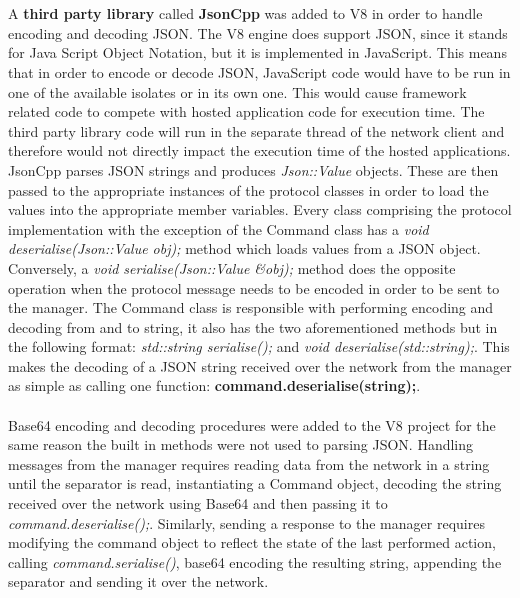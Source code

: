\documentclass{l4proj}
\begin{document}
\\\\
\hspace*{3em} A \textbf{third party library} called \textbf{JsonCpp} was added to V8 in order to handle encoding and decoding JSON. The V8 engine does support JSON, since it stands for Java Script Object Notation, but it is implemented in JavaScript. This means that in order to encode or decode JSON, JavaScript code would have to be run in one of the available isolates or in its own one. This would cause framework related code to compete with hosted application code for execution time. The third party library code will run in the separate thread of the network client and therefore would not directly impact the execution time of the hosted applications. JsonCpp parses JSON strings and produces \textit{Json::Value} objects. These are then passed to the appropriate instances of the protocol classes in order to load the values into the appropriate member variables. Every class comprising the protocol implementation with the exception of the Command class has a \textit{void deserialise(Json::Value obj);} method which loads values from a JSON object. Conversely, a \textit{void serialise(Json::Value \&obj);} method does the opposite operation when the protocol message needs to be encoded in order to be sent to the manager. The Command class is responsible with performing encoding and decoding from and to string, it also has the two aforementioned methods but in the following format: \textit{std::string serialise();} and \textit{void deserialise(std::string);}. This makes the decoding of a JSON string received over the network from the manager as simple as calling one function: \textbf{command.deserialise(string);}.
\\\\
\hspace*{3em} Base64 encoding and decoding procedures were added to the V8 project for the same reason the built in methods were not used to parsing JSON. Handling messages from the manager requires reading data from the network in a string until the separator is read, instantiating a Command object, decoding the string received over the network using Base64 and then passing it to \textit{command.deserialise();}. Similarly, sending a response to the manager requires modifying the command object to reflect the state of the last performed action, calling \textit{command.serialise()}, base64 encoding the resulting string, appending the separator and sending it over the network.
\end{document}
